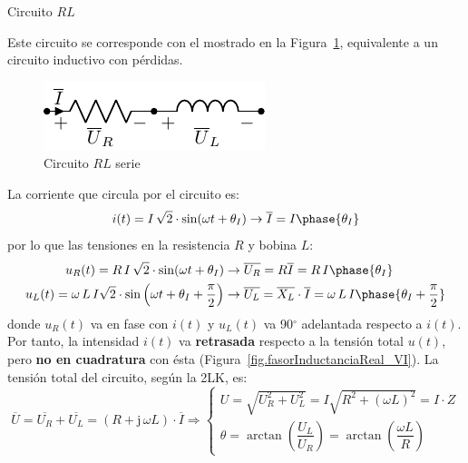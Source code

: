 \documentclass[11pt]{book} %
\makeatletter
\numberwithin{dummy}{section}
\theoremstyle{ocrenumbox}
\theoremstyle{blacknumex}
\theoremstyle{blacknumbox}
\theoremstyle{ocrenum}
\renewcommand{\subsection}{\@startsection {subsection}{2}{\z@}
{-3ex \@plus -0.1ex \@minus -.4ex}
{0.5ex \@plus.2ex }
{\normalfont\sffamily\bfseries}}
\newlength\esp
\makeatother
\begin{document}
	\subsection{Circuito $RL$}\label{sec.RL}
	
	Este circuito se corresponde con el mostrado en la Figura~\ref{fig.RL}, equivalente a un circuito inductivo con pérdidas. 
	\begin{figure}[h]
		\centering
		\includegraphics[width=0.3\linewidth]{../figs/RL.pdf}
		\caption{Circuito $RL$ serie}
		\label{fig.RL}
	\end{figure}
	
	La corriente que circula por el circuito es:
	\begin{equation*}
		i(t)=I\,\sqrt{2}\cdot\sin(\omega t+\theta_I)\rightarrow\overline{I}=I\phase{\theta_I}
	\end{equation*}
	por lo que las tensiones en la resistencia $R$ y bobina $L$:
	\begin{align*}
		u_R(t)=R\, I\,\sqrt{2}\cdot\sin(\omega t+\theta_I)&\rightarrow \overline{U_R} = R \overline{I}=R\,I\phase{\theta_I}\\ 
		u_L(t)= \omega\,L\,I \sqrt{2}\cdot \sin \left(\omega t+\theta_I+\frac{\pi}{2}\right)&\rightarrow \overline{U_L}=\overline{X_L}\cdot\overline{I}= \omega\,L\,I\phase{\theta_I+\frac{\pi}{2}}
	\end{align*}
	donde $u_R(t)$ va en fase con $i(t)$ y $u_L(t)$ va 90$^\circ$ adelantada respecto a $i(t)$. Por tanto, la intensidad $i(t)$ va \textbf{retrasada} respecto a la tensión total $u(t)$, pero \textbf{no en cuadratura} con ésta  (Figura~\ref{fig.fasorInductanciaReal_VI}). La tensión total del circuito, según la 2LK, es:  
	\begin{equation*}
		\overline{U} = \overline{U_R} + \overline{U_L} =(R + \mathrm{j}\,\omega L) \cdot \overline{I}\Rightarrow 
		\begin{cases}
			U=\sqrt{U_R^2+U_L^2}=I\sqrt{R^2+(\omega L)^2}=I\cdot Z\\
			\theta=\arctan\left( \dfrac{U_L}{U_R}\right)=\arctan\left( \dfrac{\omega L}{R}\right)
		\end{cases}
	\end{equation*}
	
\end{document}
